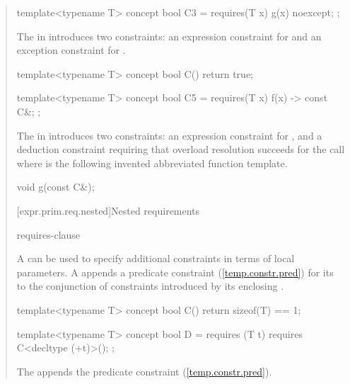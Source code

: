 \begin{quote}
\begin{codeblock}
template<typename T> concept bool C3 =
  requires(T x) {
    {g(x)} noexcept;
  };
\end{codeblock}

The  in  
introduces two constraints: an expression constraint for  
and an exception constraint for .

\begin{codeblock}
template<typename T> concept bool C() { return true; }

template<typename T> concept bool C5 =
  requires(T x) {
    {f(x)} -> const C&;
  };
\end{codeblock}

The  in  
introduces two constraints: an expression constraint for , 
and a deduction constraint requiring that overload resolution succeeds for the
call  where  is the following
invented abbreviated function template.
\begin{codeblock}
void g(const C&);
\end{codeblock}
\exitexample

[expr.prim.req.nested]{Nested requirements}

\begin{bnf}
\br
    requires-clause \terminal{;}
  \end{bnf}

\pnum
A  can be used
to specify additional constraints in terms of local parameters.
%
A  appends a predicate constraint 
(\ref{temp.constr.pred}) for its  
to the conjunction of constraints introduced by its enclosing
.

\enterexample
\begin{codeblock}
template<typename T> concept bool C() { return sizeof(T) == 1; }

template<typename T> concept bool D =
  requires (T t) {
    requires C<decltype (+t)>();
  };
\end{codeblock}
The  appends the predicate constraint 
 (\ref{temp.constr.pred}).
\exitexample

\end{quote}